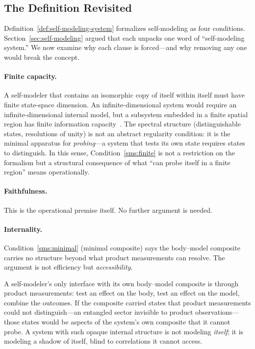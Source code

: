 \subsection{The Definition Revisited}\label{subsec:unified}

Definition~\ref{def:self-modeling-system} formalizes self-modeling as
four conditions.  Section~\ref{sec:self-modeling} argued that each
unpacks one word of ``self-modeling system.''  We now examine why each
clause is forced---and why removing any one would break the concept.

\paragraph{Finite capacity.}
A self-modeler that contains an isomorphic copy of itself within itself
must have finite state-space dimension.  An infinite-dimensional system
would require an infinite-dimensional internal model, but a subsystem
embedded in a finite spatial region has finite information
capacity~\cite{Bekenstein1981}.  The spectral structure
(distinguishable states, resolutions of unity) is not an abstract
regularity condition: it is the minimal apparatus for
\emph{probing}---a system that tests its own state requires states to
distinguish.  In this sense, Condition~\ref{sms:finite} is not a
restriction on the formalism but a structural consequence of what ``can
probe itself in a finite region'' means operationally.

\paragraph{Faithfulness.}
This is the operational premise itself.  No further argument is needed.

\paragraph{Internality.}
Condition~\ref{sms:minimal} (minimal composite) says the body--model
composite carries no structure beyond what product measurements can
resolve.  The argument is not efficiency but \emph{accessibility}.

A self-modeler's only interface with its own body--model composite is
through product measurements: test an effect on the body, test an
effect on the model, combine the outcomes.  If the composite carried
states that product measurements could not distinguish---an entangled
sector invisible to product observations---those states would be
aspects of the system's own composite that it cannot probe.  A system
with such opaque internal structure is not modeling \emph{itself}; it
is modeling a shadow of itself, blind to correlations it cannot
access.

